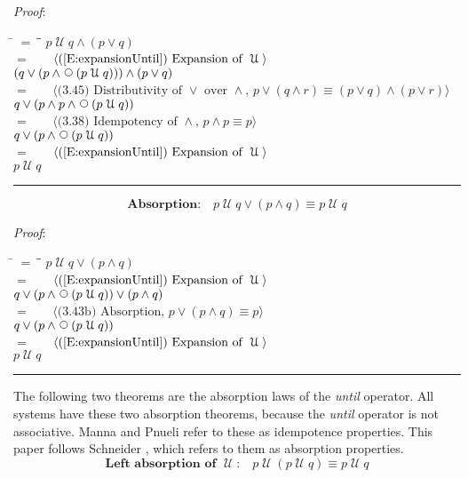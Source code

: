 \documentclass[12pt, fleqn, leqno]{article}
\newcommand{\lgap}{2pt}                             %
\newcommand{\mymathindent}{24pt}                    %
\newcommand{\Until}{\;\mathcal{U}\;}
\newcommand{\Next}{\;\,\text{\raisebox{3.5pt}{\circle{6}}}}
\newcommand{\myqed}{\rule[-.23ex]{1.2ex}{2.0ex}}
\newcommand{\myqedtab}{\hspace{384pt}}              %
\newcommand{\Gll} {\langle}                         %
\newcommand{\Ggg} {\rangle}                         %
\newcommand{\Hint}[1]     {\ \ \ $\Gll              \mbox{#1} \Ggg$ }   %
\begin{document}
\emph{Proof}:
\begin{tabbing}
\hspace{\mymathindent} \= $= \;$ \= \myqedtab \= \kill
  \> \>   $p \Until q \land (p \lor q)$\\[\lgap]
  \> $=$  \>  \Hint{(\ref{E:expansionUntil}) Expansion of $\Until$}\\[\lgap]
  \> \>   $(q \lor (p \land \Next(p \Until q))) \land (p \lor q)$\\[\lgap]
  \> $=$  \>  \Hint{(3.45) Distributivity of $\lor$ over $\land$, $p\lor (q\land r)\equiv (p\lor q)\land (p\lor r)$}\\[\lgap]
  \> \>   $q \lor (p \land p \land \Next(p \Until q))$\\[\lgap]
  \> $=$  \>  \Hint{(3.38) Idempotency of $\land$, $p \land p \equiv p$}\\[\lgap]
  \> \>   $q \lor (p \land \Next(p \Until q))$\\[\lgap]
  \> $=$  \>  \Hint{(\ref{E:expansionUntil}) Expansion of $\Until$}\\[\lgap]
  \> \>   $p \Until q$ \quad \myqed
\end{tabbing}
\begin{equation}\label{E:untilOrAnd}
\textbf{Absorption:}\quad p \Until q \lor (p \land q) \equiv p \Until q
\end{equation}

\emph{Proof}:
\begin{tabbing}
\hspace{\mymathindent} \= $= \;$ \= \myqedtab \= \kill
  \> \>   $p \Until q \lor (p \land q)$\\[\lgap]
  \> $=$  \>  \Hint{(\ref{E:expansionUntil}) Expansion of $\Until$}\\[\lgap]
  \> \>   $q \lor (p \land \Next(p \Until q)) \lor (p \land q)$\\[\lgap]
  \> $=$  \>  \Hint{(3.43b) Absorption, $p \lor (p \land q) \equiv p$}\\[\lgap]
  \> \>   $q \lor (p \land \Next(p \Until q))$\\[\lgap]
  \> $=$  \>  \Hint{(\ref{E:expansionUntil}) Expansion of $\Until$}\\[\lgap]
  \> \>   $p \Until q$ \quad \myqed
\end{tabbing}

The following two theorems are the absorption laws of the \textit{until} operator.
All systems have these two absorption theorems, because the \textit{until} operator is not associative.
Manna and Pnueli \cite{Manna} refer to these as idempotence properties.
This paper follows Schneider \cite{Schn}, which refers to them as absorption properties.
\begin{equation}\label{E:untilIdem}
\textbf{Left absorption of $\Until$:}\quad p \Until (p \Until q) \equiv p \Until q
\end{equation}
\end{document}
